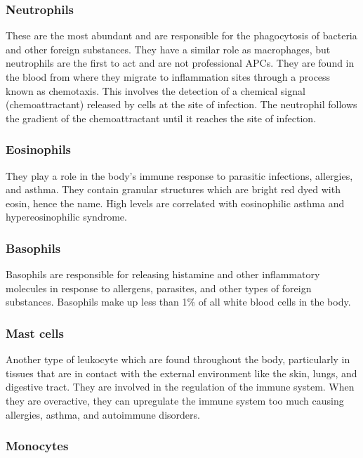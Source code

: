 \subsubsection{Neutrophils}

These are the most abundant and are responsible for the phagocytosis of bacteria and other foreign substances. They have a similar role as macrophages, but neutrophils are the first to act and are not professional APCs. They are found in the blood from where they migrate to inflammation sites through a process known as chemotaxis. This involves the detection of a chemical signal (chemoattractant) released by cells at the site of infection. The neutrophil follows the gradient of the chemoattractant until it reaches the site of infection.

\subsubsection{Eosinophils}

They play a role in the body's immune response to parasitic infections, allergies, and asthma. They contain granular structures which are bright red dyed with eosin, hence the name. High levels are correlated with eosinophilic asthma and hypereosinophilic syndrome.

\subsubsection{Basophils}

Basophils are responsible for releasing histamine and other inflammatory molecules in response to allergens, parasites, and other types of foreign substances. Basophils make up less than 1\% of all white blood cells in the body.
        
\subsubsection{Mast cells}

Another type of leukocyte which are found throughout the body, particularly in tissues that are in contact with the external environment like the skin, lungs, and digestive tract. They are involved in the regulation of the immune system. When they are overactive, they can upregulate the immune system too much causing allergies, asthma, and autoimmune disorders.

\subsubsection{Monocytes}

